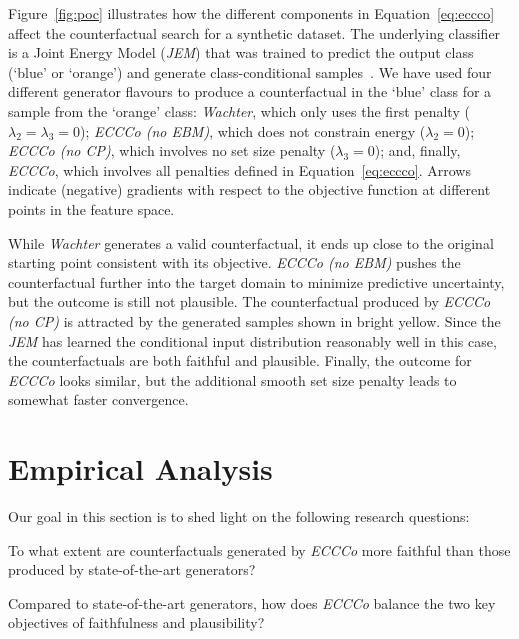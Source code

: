 Figure~\ref{fig:poc} illustrates how the different components in Equation~\ref{eq:eccco} affect the counterfactual search for a synthetic dataset. The underlying classifier is a Joint Energy Model (\textit{JEM}) that was trained to predict the output class (`blue' or `orange') and generate class-conditional samples~\citep{grathwohl2020your}. We have used four different generator flavours to produce a counterfactual in the `blue' class for a sample from the `orange' class: \textit{Wachter}, which only uses the first penalty ($\lambda_2=\lambda_3=0$); \textit{ECCCo (no EBM)}, which does not constrain energy ($\lambda_2=0$); \textit{ECCCo (no CP)}, which involves no set size penalty ($\lambda_3=0$); and, finally, \textit{ECCCo}, which involves all penalties defined in Equation~\ref{eq:eccco}. Arrows indicate (negative) gradients with respect to the objective function at different points in the feature space. 

While \textit{Wachter} generates a valid counterfactual, it ends up close to the original starting point consistent with its objective. \textit{ECCCo (no EBM)} pushes the counterfactual further into the target domain to minimize predictive uncertainty, but the outcome is still not plausible. The counterfactual produced by \textit{ECCCo (no CP)} is attracted by the generated samples shown in bright yellow. Since the \textit{JEM} has learned the conditional input distribution reasonably well in this case, the counterfactuals are both faithful and plausible. Finally, the outcome for \textit{ECCCo} looks similar, but the additional smooth set size penalty leads to somewhat faster convergence. 

\section{Empirical Analysis}\label{emp}

Our goal in this section is to shed light on the following research questions:

\begin{question}[Faithfulness]\label{rq:faithfulness}
  To what extent are counterfactuals generated by \textit{ECCCo} more faithful than those produced by state-of-the-art generators?
\end{question}

\begin{question}\label{rq:plausibility}
  Compared to state-of-the-art generators, how does \textit{ECCCo} balance the two key objectives of faithfulness and plausibility?
\end{question}

